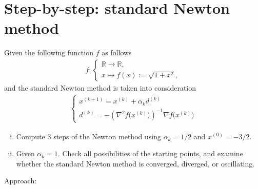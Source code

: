 \documentclass[12pt]{article}
\begin{document}
\section{Step-by-step: standard Newton method}
\begin{exampleboxed}
	Given the following function $f$ as follows
	\begin{align}
		f:
		\begin{cases}
			\mathbb{R} \to \mathbb{R}, \\
			x \mapsto f(x):=\sqrt{1+x^2},
		\end{cases}
	\end{align}
	and the standard Newton method is taken into consideration
	\begin{align}
		\label{eq:standardNewton}
		\begin{cases}
			x^{(k+1)} = x^{(k)} + \alpha_k d^{(k)} \\
			d^{(k)}   = - {\left( \nabla^2 f\Big(x^{(k)}\Big) \right)}^{-1} \nabla f\Big(x^{(k)}\Big)
		\end{cases}
	\end{align}
	\begin{enumerate}[(i)]
		\item Compute $3$ steps of the Newton method using $\alpha_k = 1/2$ and $x^{(0)} = -3/2$.
		\item Given $\alpha_k = 1$. Check all possibilities of the starting points,
		      and examine whether the standard Newton method is converged, diverged, or oscillating.
	\end{enumerate}
\end{exampleboxed}
Approach:
\end{document}
